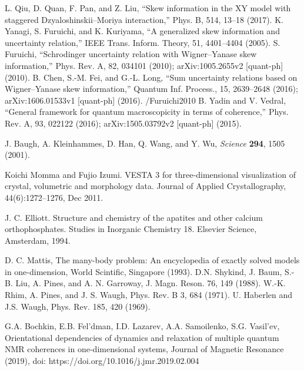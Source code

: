 \begin{thebibliography}{}
 L. Qiu, D. Quan, F. Pan, and Z. Liu, “Skew information in the XY model with staggered Dzyaloshinskii–Moriya
interaction,” Phys. B, 514, 13–18 (2017).
 K. Yanagi, S. Furuichi, and K. Kuriyama, “A generalized skew information and uncertainty relation,” IEEE Trans. Inform. Theory, 51, 4401–4404 (2005).
 S. Furuichi, “Schrodinger uncertainty relation with Wigner–Yanase skew information,” Phys. Rev. A, 82, 034101 (2010); arXiv:1005.2655v2 [quant-ph] (2010).
 B. Chen, S.-M. Fei, and G.-L. Long, “Sum uncertainty relations based on Wigner–Yanase skew information,” Quantum Inf. Process., 15, 2639–2648 (2016); arXiv:1606.01533v1 [quant-ph] (2016).
/Furuichi2010
 B. Yadin and V. Vedral, “General framework for quantum macroscopicity in terms of coherence,” Phys. Rev. A, 93, 022122 (2016); arXiv:1505.03792v2 [quant-ph] (2015).



J. Baugh, A. Kleinhammes, D. Han, Q. Wang, and Y. Wu, \textit{Science} \textbf{294}, 1505 (2001).



 Koichi Momma and Fujio Izumi. VESTA 3 for three-dimensional visualization of crystal, volumetric and morphology data. Journal of Applied Crystallography, 44(6):1272–1276, Dec 2011.

 J. C. Elliott. Structure and chemistry of the apatites and other calcium orthophosphates. Studies in Inorganic Chemistry 18. Elsevier Science, Amsterdam, 1994.

 D. C. Mattis, The many-body problem: An encyclopedia of exactly solved models in one-dimension, World Scintific, Singapore (1993).
 D.N. Shykind, J. Baum, S.-B. Liu, A. Pines, and A. N. Garroway, J. Magn. Reson. 76, 149 (1988).
 W.-K. Rhim, A. Pines, and J. S. Waugh, Phys. Rev. B 3, 684 (1971).
 U. Haberlen and J.S. Waugh, Phys. Rev. 185, 420 (1969).

 G.A. Bochkin, E.B. Fel’dman, I.D. Lazarev, A.A. Samoilenko, S.G. Vasil’ev, Orientational dependencies of dynamics and relaxation of multiple quantum NMR coherences in one-dimensional systems, Journal of Magnetic Resonance (2019), doi: https://doi.org/10.1016/j.jmr.2019.02.004




\end{thebibliography}
